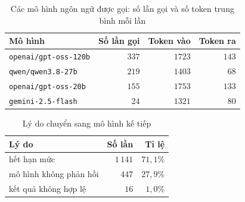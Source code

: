 \begin{table}[H]
\centering
\caption{Các mô hình ngôn ngữ được gọi: số lần gọi và số token trung bình mỗi lần}\label{tab:db-models}
\begin{tabular}{lrrr}
\toprule
Mô hình & Số lần gọi & Token vào & Token ra \\
\midrule
\texttt{openai/gpt-oss-120b} & $337$ & $1723$ & $143$ \\
\texttt{qwen/qwen3.8-27b} & $219$ & $1403$ & $68$ \\
\texttt{openai/gpt-oss-20b} & $155$ & $1753$ & $133$ \\
\texttt{gemini-2.5-flash} & $24$ & $1321$ & $80$ \\
\bottomrule
\end{tabular}
\end{table}
\begin{table}[H]
\centering
\caption{Lý do chuyển sang mô hình kế tiếp}\label{tab:db-fallback}
\begin{tabular}{lrr}
\toprule
Lý do & Số lần & Tỉ lệ \\
\midrule
hết hạn mức & $1\,141$ & $71{,}1$\% \\
mô hình không phản hồi & $447$ & $27{,}9$\% \\
kết quả không hợp lệ & $16$ & $1{,}0$\% \\
\bottomrule
\end{tabular}
\end{table}
